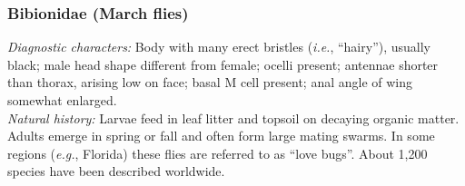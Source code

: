 \documentclass[letterpaper, 11pt]{article}
\begin{document}
\subsubsection{Bibionidae (March flies)}
\noindent{}\textit{Diagnostic characters:} Body with many erect bristles (\textit{i.e.}, ``hairy''), usually black; male head shape different from female; ocelli present; antennae shorter than thorax, arising low on face; basal M cell present; anal angle of wing somewhat enlarged.\\

\noindent{}\textit{Natural history:} Larvae feed in leaf litter and topsoil on decaying organic matter. Adults emerge in spring or fall and often form large mating swarms. In some regions (\textit{e.g.}, Florida) these flies are referred to as ``love bugs''. About 1,200 species have been described worldwide.
\end{document}
